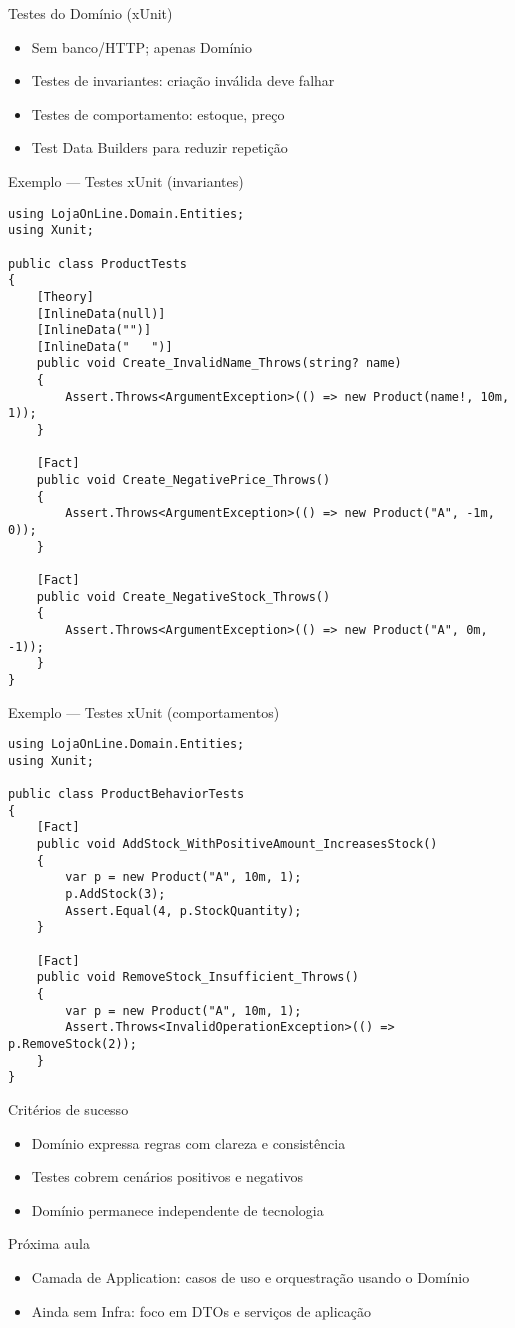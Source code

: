 \documentclass{beamer}
\begin{document}
\begin{frame}{Testes do Domínio (xUnit)}
\begin{itemize}
  \item Sem banco/HTTP; apenas Domínio
  \item Testes de invariantes: criação inválida deve falhar
  \item Testes de comportamento: estoque, preço
  \item Test Data Builders para reduzir repetição
\end{itemize}
\end{frame}

\begin{frame}[fragile]{Exemplo — Testes xUnit (invariantes)}
\begin{lstlisting}
using LojaOnLine.Domain.Entities;
using Xunit;

public class ProductTests
{
    [Theory]
    [InlineData(null)]
    [InlineData("")]
    [InlineData("   ")]
    public void Create_InvalidName_Throws(string? name)
    {
        Assert.Throws<ArgumentException>(() => new Product(name!, 10m, 1));
    }

    [Fact]
    public void Create_NegativePrice_Throws()
    {
        Assert.Throws<ArgumentException>(() => new Product("A", -1m, 0));
    }

    [Fact]
    public void Create_NegativeStock_Throws()
    {
        Assert.Throws<ArgumentException>(() => new Product("A", 0m, -1));
    }
}
\end{lstlisting}
\end{frame}

\begin{frame}[fragile]{Exemplo — Testes xUnit (comportamentos)}
\begin{lstlisting}
using LojaOnLine.Domain.Entities;
using Xunit;

public class ProductBehaviorTests
{
    [Fact]
    public void AddStock_WithPositiveAmount_IncreasesStock()
    {
        var p = new Product("A", 10m, 1);
        p.AddStock(3);
        Assert.Equal(4, p.StockQuantity);
    }

    [Fact]
    public void RemoveStock_Insufficient_Throws()
    {
        var p = new Product("A", 10m, 1);
        Assert.Throws<InvalidOperationException>(() => p.RemoveStock(2));
    }
}
\end{lstlisting}
\end{frame}

\begin{frame}{Critérios de sucesso}
\begin{itemize}
  \item Domínio expressa regras com clareza e consistência
  \item Testes cobrem cenários positivos e negativos
  \item Domínio permanece independente de tecnologia
\end{itemize}
\end{frame}

\begin{frame}{Próxima aula}
\begin{itemize}
  \item Camada de Application: casos de uso e orquestração usando o Domínio
  \item Ainda sem Infra: foco em DTOs e serviços de aplicação
\end{itemize}
\end{frame}
\end{document}
